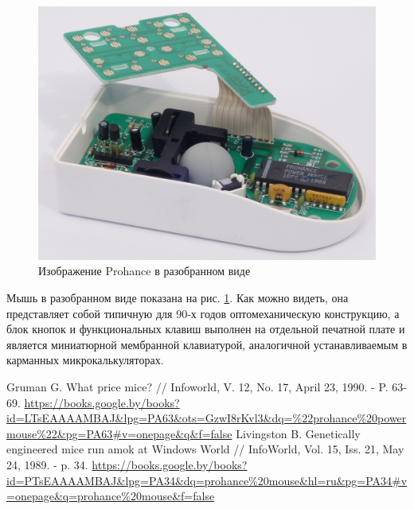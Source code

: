 \documentclass[11pt, a4paper]{article}
\begin{document}
\begin{figure}[h]
    \centering
    \includegraphics[scale=0.8]{1989_prohance_powermouse/6.1.jpg}
    \caption{Изображение Prohance в разобранном виде}
    \label{fig:ProhanceInside}
\end{figure}

Мышь в разобранном виде показана на рис. \ref{fig:ProhanceInside}. Как можно видеть, она представляет собой типичную для 90-х годов оптомеханическую конструкцию, а блок кнопок и функциональных клавиш выполнен на отдельной печатной плате и является миниатюрной мембранной клавиатурой, аналогичной устанавливаемым в карманных микрокалькуляторах.

\begin{thebibliography}{9}
 Gruman G. What price mice? // Infoworld, V. 12, No. 17, April 23, 1990. - P. 63-69. \url{https://books.google.by/books?id=LTsEAAAAMBAJ&lpg=PA63&ots=GzwI8rKvl3&dq=%22prohance%20powermouse%22&pg=PA63#v=onepage&q&f=false}
 Livingston B. Genetically engineered mice run amok at Windows World // InfoWorld, Vol. 15, Iss. 21, May 24, 1989. - p. 34. \url{https://books.google.by/books?id=PTsEAAAAMBAJ&lpg=PA34&dq=prohance%20mouse&hl=ru&pg=PA34#v=onepage&q=prohance%20mouse&f=false}
\end{thebibliography}
\end{document}
